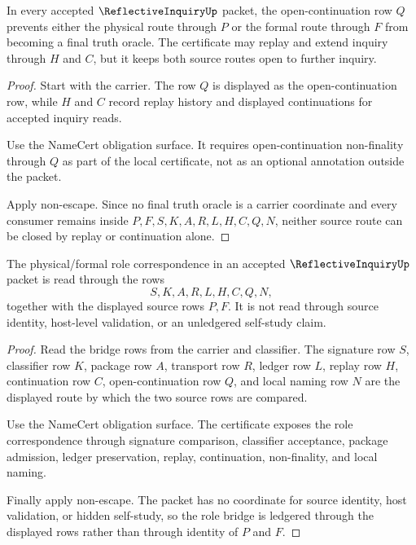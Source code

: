 \begin{theorem}
\label{thm:reflective-inquiry-open-continuation-preservation}
In every accepted $\ReflectiveInquiryUp$ packet, the open-continuation row $Q$ prevents either the physical route through $P$ or the formal route through $F$ from becoming a final truth oracle. The certificate may replay and extend inquiry through $H$ and $C$, but it keeps both source routes open to further inquiry.
\end{theorem}
\begin{proof}
Start with the carrier. The row $Q$ is displayed as the open-continuation row, while $H$ and $C$ record replay history and displayed continuations for accepted inquiry reads.

Use the NameCert obligation surface. It requires open-continuation non-finality through $Q$ as part of the local certificate, not as an optional annotation outside the packet.

Apply non-escape. Since no final truth oracle is a carrier coordinate and every consumer remains inside $P,F,S,K,A,R,L,H,C,Q,N$, neither source route can be closed by replay or continuation alone.
\end{proof}

\begin{theorem}
\label{thm:reflective-inquiry-ledgered-role-correspondence}
The physical/formal role correspondence in an accepted $\ReflectiveInquiryUp$ packet is read through the rows
$$
S,K,A,R,L,H,C,Q,N,
$$
together with the displayed source rows $P,F$. It is not read through source identity, host-level validation, or an unledgered self-study claim.
\end{theorem}
\begin{proof}
Read the bridge rows from the carrier and classifier. The signature row $S$, classifier row $K$, package row $A$, transport row $R$, ledger row $L$, replay row $H$, continuation row $C$, open-continuation row $Q$, and local naming row $N$ are the displayed route by which the two source rows are compared.

Use the NameCert obligation surface. The certificate exposes the role correspondence through signature comparison, classifier acceptance, package admission, ledger preservation, replay, continuation, non-finality, and local naming.

Finally apply non-escape. The packet has no coordinate for source identity, host validation, or hidden self-study, so the role bridge is ledgered through the displayed rows rather than through identity of $P$ and $F$.
\end{proof}

